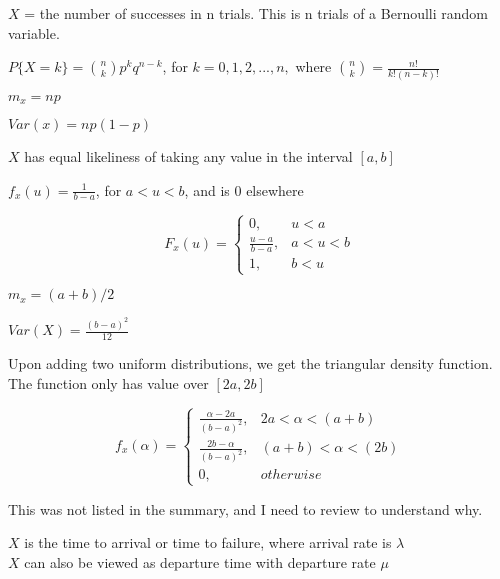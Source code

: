 
$X$ = the number of successes in n trials.
This is n trials of a Bernoulli random variable.

$P\{X=k\} = \binom{n}{k}p^kq^{n-k}$, for $k=0,1,2,...,n,$ where $\binom{n}{k}=\frac{n!}{k!(n-k)!}$

$m_x=np$

$Var(x)=np(1-p)$
    

$X$ has equal likeliness of taking any value in the interval $[a,b]$

$f_x(u) = \frac{1}{b-a}$, for $a<u<b$, and is 0 elsewhere

\[ F_x(u)=
  \begin{cases} 
      0,               &     u < a \\
      \frac{u-a}{b-a}, & a < u < b \\
      1,               & b < u 
   \end{cases}
\]

$m_x=(a+b)/2 $ 

$Var(X)=\frac{(b-a)^2}{12}$
    


Upon adding two uniform distributions, we get the triangular density function. The function only has value over $[2a,2b]$

\[ f_x(\alpha)=
  \begin{cases} 
    \frac{\alpha-2a}{(b-a)^2}, & 2a<\alpha<(a+b) \\
    \frac{2b-\alpha}{(b-a)^2}, & (a+b)<\alpha<(2b) \\
    0,                         & otherwise
  \end{cases}
\]

This was not listed in the summary, and I need to review to understand why.
    


$X$ is the time to arrival or time to failure, where arrival rate is $\lambda$ \\
$X$ can also be viewed as departure time with departure rate $\mu$

